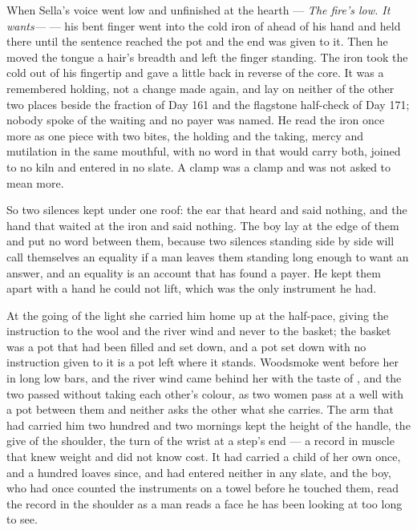 When Sella's voice went low and unfinished at the hearth --- \emph{The fire's low. It wants---} --- his bent finger went into the cold iron of  ahead of his hand and held there until the sentence reached the pot and the end was given to it. Then he moved the tongue a hair's breadth and left the finger standing. The iron took the cold out of his fingertip and gave a little back in reverse of the core. It was a remembered holding, not a change made again, and lay on neither of the other two places beside the fraction of Day 161 and the flagstone half-check of Day 171; nobody spoke of the waiting and no payer was named. He read the iron once more as one piece with two bites, the holding and the taking, mercy and mutilation in the same mouthful, with no word in  that would carry both, joined to no kiln and entered in no slate. A clamp was a clamp and was not asked to mean more.

So two silences kept under one roof: the ear that heard and said nothing, and the hand that waited at the iron and said nothing. The boy lay at the edge of them and put no word between them, because two silences standing side by side will call themselves an equality if a man leaves them standing long enough to want an answer, and an equality is an account that has found a payer. He kept them apart with a hand he could not lift, which was the only instrument he had.

\scenebreak

At the going of the light she carried him home up  at the half-pace, giving the instruction to the wool and the river wind and never to the basket; the basket was a pot that had been filled and set down, and a pot set down with no instruction given to it is a pot left where it stands. Woodsmoke went before her in long low bars, and the river wind came behind her with the taste of , and the two passed without taking each other's colour, as two women pass at a well with a pot between them and neither asks the other what she carries. The arm that had carried him two hundred and two mornings kept the height of the handle, the give of the shoulder, the turn of the wrist at a step's end --- a record in muscle that knew weight and did not know cost. It had carried a child of her own once, and a hundred loaves since, and had entered neither in any slate, and the boy, who had once counted the instruments on a towel before he touched them, read the record in the shoulder as a man reads a face he has been looking at too long to see.

